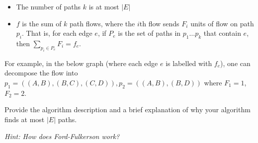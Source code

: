 \documentclass[11pt]{article}
\begin{document}
\begin{itemize}
\item The number of paths $k$ is at most $|E|$
\item $f$ is the sum of $k$ path flows, where the $i$th flow sends $F_i$ units of flow on path $p_i$. That is, for each edge $e$, if $P_e$ is the set of paths in $p_1 \ldots p_k$ that contain $e$, then $\sum_{p_i \in P_e} F_i = f_e$.
\end{itemize}

For example, in the below graph (where each edge $e$ is labelled with $f_e$), one can decompose the flow into $p_1 = ((A, B), (B, C), (C, D)), p_2 = ((A, B), (B, D))$ where $F_1 = 1$, $F_2 = 2$.

\begin{center}
\end{center}

Provide the algorithm description and a brief explanation of why your algorithm finds at most $|E|$ paths. 

\emph{Hint: How does Ford-Fulkerson work?}

\newpage

\end{document}
